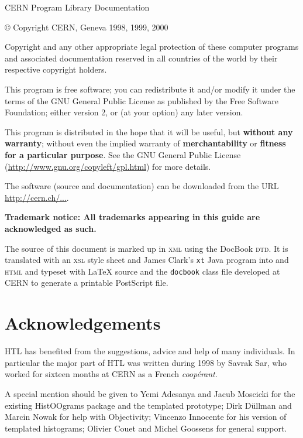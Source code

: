 {{\begin{minipage}{0.96\textwidth}
CERN Program Library Documentation
 
\copyright{} Copyright CERN, Geneva 1998, 1999, 2000
 
Copyright and any other appropriate legal protection of these
computer programs and associated documentation reserved in all
countries of the world by their respective copyright holders.

This program is free software; you can redistribute it and/or modify
it under the terms of the GNU General Public License as published by
the Free Software Foundation; either version 2, or (at your option)
any later version.

This program is distributed in the hope that it will be useful, but
\textbf{without any warranty}; without even the implied warranty of
\textbf{merchantability} or \textbf{fitness for a particular purpose}.
See the GNU General Public License
(\url{http://www.gnu.org/copyleft/gpl.html}) for more details.

The software (source and documentation) can be downloaded from the
URL \url{http://cern.ch/...}.

\vspace*{2mm}

\end{minipage}\hfill}%
\vspace{6mm} \textbf{Trademark notice: All trademarks appearing in
  this guide are acknowledged as such.}  
\bigskip 

{\small The source of this document is marked up in \textsc{xml}
  using the DocBook \textsc{dtd}.
  It is translated with an \textsc{xsl} style sheet and James
  Clark's \texttt{xt} Java program into and \textsc{html} and 
  typeset with \LaTeX{} source and the \texttt{docbook}
  class file developed at CERN to generate a printable PostScript file.}

\section*{Acknowledgements}

HTL has benefited from the suggestions, advice and help of many
individuals.  In particular the major part of HTL was written during
1998 by Savrak Sar, who worked for sixteen months at CERN as a French
\emph{coop\'erant}.

A special mention should be given to Yemi Adesanya and Jacub Moscicki
for the existing HistOOgrams package and the templated prototype; Dirk
D\"ullman and Marcin Nowak for help with Objectivity; Vincenzo
Innocente for his version of templated histograms; Olivier Couet and
Michel Goossens for general support.

}
